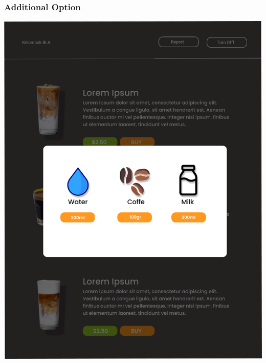 \documentclass[12pt]{article}
\begin{document}
\subsubsection{Additional Option}
\includegraphics[width=1\linewidth]{./img/additionalMenu.png}
\end{document}
